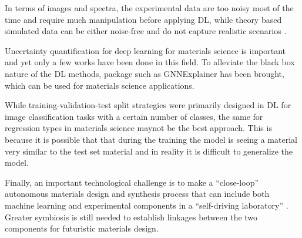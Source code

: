 \documentclass[pdflatex,sn-mathphys]{sn-jnl}%
\theoremstyle{thmstyleone}%
\theoremstyle{thmstyletwo}%
\theoremstyle{thmstylethree}%
\begin{document}
In terms of images and spectra, the experimental data are too noisy most of the time and require much manipulation before applying DL, while theory based simulated data can be either noise-free and do not capture realistic scenarios \cite{choudhary2021computational}. 

Uncertainty quantification for deep learning for materials science is important and yet only a few works have been done in this field. To alleviate the black box nature of the DL methods, package such as GNNExplainer \cite{ying2019gnnexplainer} has been brought, which can be used for materials science applications. 

While training-validation-test split strategies were primarily designed in DL for image classification tasks with a certain number of classes, the same for regression types in materials science maynot be the best approach. This is because it is possible that that during the training the model is seeing a material very similar to the test set material and in reality it is difficult to generalize the model. 

Finally, an important technological challenge is to make a ``close-loop'' autonomous materials design and synthesis process \cite{roch2018chemos,szymanski2021toward} that can include both machine learning and experimental components in a ``self-driving laboratory'' \cite{macleod2020self}. Greater symbiosis is still needed to establish linkages between the two components for futuristic materials design.




\end{document}
